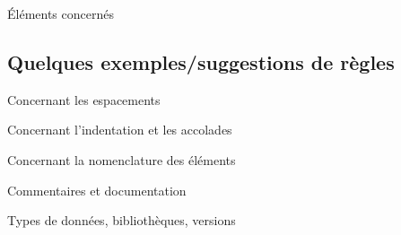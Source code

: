 \begin{frame}{Éléments concernés}

\end{frame}

\subsection{Quelques exemples/suggestions de règles}

\begin{frame}{Concernant les espacements}

\end{frame}

\begin{frame}{Concernant l’indentation et les accolades}

\end{frame}

\begin{frame}{Concernant la nomenclature des éléments}

\end{frame}

\begin{frame}{Commentaires et documentation}

\end{frame}

\begin{frame}{Types de données, bibliothèques, versions}

\end{frame}

